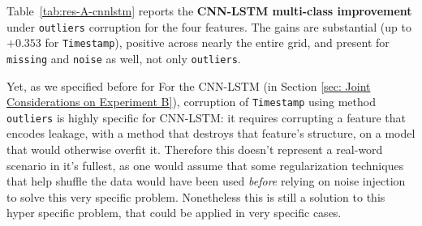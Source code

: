 \documentclass[../main.tex]{subfiles}
\begin{document}
\begin{table}[H]
\centering
\caption{: CNN-LSTM multi-class $\Delta\mathrm{MCC} \pm \delta$ under \texttt{outliers} corruption (baseline $0.580$), where $\delta$ is the Student-$t$ $95\%$ half-width over the five seeds. Gains are large and \emph{tightly bounded} for three of the four features (margins as small as $\pm 0.008$); \texttt{Protocol} is the exception (see text), its $\approx\!\pm 0.5$ margins revealing that its five seeds disagree even on the sign. A margin of $\pm 0.000$ denotes a cell in which all five seeds returned a numerically identical MCC.}
\label{tab:res-A-cnnlstm}
\small
{}
\end{table}

Table~\ref{tab:res-A-cnnlstm} reports the \textbf{CNN-LSTM multi-class improvement} under \texttt{outliers} corruption for the four features. The gains are substantial (up to $+0.353$ for \texttt{Timestamp}), positive across nearly the entire grid, and present for \texttt{missing} and \texttt{noise} as well, not only \texttt{outliers}. 

Yet, as we specified before for For the CNN-LSTM (in Section \ref{sec: Joint Considerations on Experiment B}), corruption of \texttt{Timestamp} using method \texttt{outliers} is highly specific for CNN-LSTM: it requires corrupting a feature that encodes leakage, with a method that destroys that feature’s structure, on a model that would otherwise overfit it. Therefore this doesn't represent a real-word scenario in it's fullest, as one would assume that some regularization techniques that help shuffle the data would have been used \emph{before} relying on noise injection to solve this very specific problem. Nonetheless this is still a solution to this hyper specific problem, that could be applied in very specific cases. 
\end{document}
